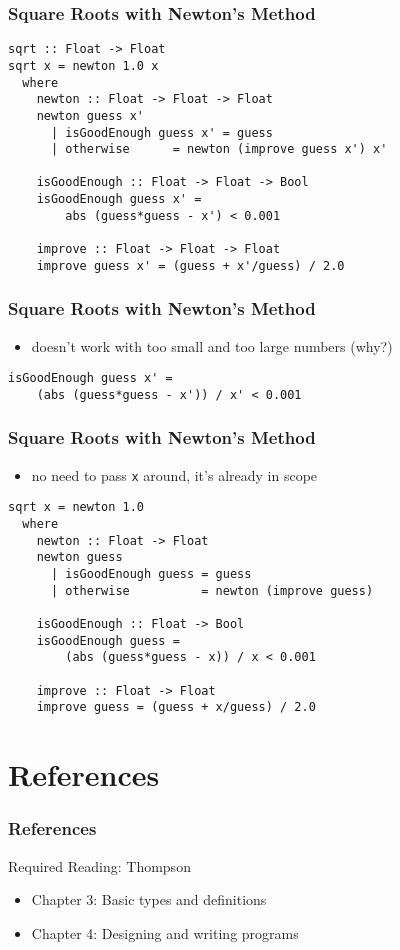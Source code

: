 \documentclass[dvipsnames]{beamer}
\theoremstyle{plain}
\begin{document}
\begin{frame}[fragile]
  \frametitle{Square Roots with Newton's Method}

  \begin{lstlisting}
sqrt :: Float -> Float
sqrt x = newton 1.0 x
  where
    newton :: Float -> Float -> Float
    newton guess x'
      | isGoodEnough guess x' = guess
      | otherwise      = newton (improve guess x') x'

    isGoodEnough :: Float -> Float -> Bool
    isGoodEnough guess x' =
        abs (guess*guess - x') < 0.001

    improve :: Float -> Float -> Float
    improve guess x' = (guess + x'/guess) / 2.0
  \end{lstlisting}
\end{frame}

\begin{frame}[fragile]
  \frametitle{Square Roots with Newton's Method}

  \begin{itemize}
    \item doesn't work with too small and too large numbers (why?)
  \end{itemize}

  \begin{lstlisting}
isGoodEnough guess x' =
    (abs (guess*guess - x')) / x' < 0.001
  \end{lstlisting}
\end{frame}

\begin{frame}[fragile]
  \frametitle{Square Roots with Newton's Method}

  \begin{itemize}
    \item no need to pass \lstinline|x| around, it's already in scope
  \end{itemize}

  \begin{lstlisting}
sqrt x = newton 1.0
  where
    newton :: Float -> Float
    newton guess
      | isGoodEnough guess = guess
      | otherwise          = newton (improve guess)

    isGoodEnough :: Float -> Bool
    isGoodEnough guess =
        (abs (guess*guess - x)) / x < 0.001

    improve :: Float -> Float
    improve guess = (guess + x/guess) / 2.0
  \end{lstlisting}
\end{frame}

\section*{References}

\begin{frame}
  \frametitle{References}

  \begin{block}{Required Reading: Thompson}
    \begin{itemize}
      \item Chapter 3: \alert{Basic types and definitions}
      \item Chapter 4: \alert{Designing and writing programs}
    \end{itemize}
  \end{block}
\end{frame}
\end{document}
